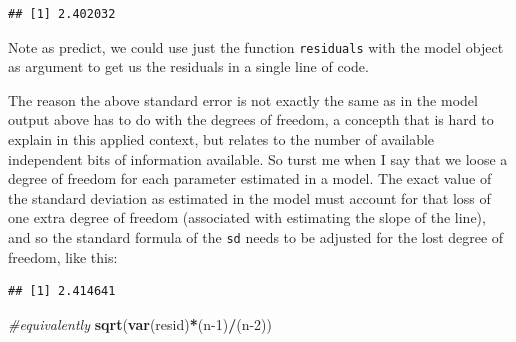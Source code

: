 \documentclass[
]{book}
\newenvironment{Shaded}{\begin{snugshade}}{\end{snugshade}}
\newcommand{\CommentTok}[1]{\textcolor[rgb]{0.56,0.35,0.01}{\textit{#1}}}
\newcommand{\DecValTok}[1]{\textcolor[rgb]{0.00,0.00,0.81}{#1}}
\newcommand{\FunctionTok}[1]{\textcolor[rgb]{0.13,0.29,0.53}{\textbf{#1}}}
\newcommand{\NormalTok}[1]{#1}
\newcommand{\OtherTok}[1]{\textcolor[rgb]{0.56,0.35,0.01}{#1}}
\newcommand{\SpecialCharTok}[1]{\textcolor[rgb]{0.81,0.36,0.00}{\textbf{#1}}}
\begin{document}
\begin{verbatim}
## [1] 2.402032
\end{verbatim}

Note as predict, we could use just the function \texttt{residuals} with the model object as argument to get us the residuals in a single line of code.

The reason the above standard error is not exactly the same as in the model output above has to do with the degrees of freedom, a concepth that is hard to explain in this applied context, but relates to the number of available independent bits of information available. So turst me when I say that we loose a degree of freedom for each parameter estimated in a model. The exact value of the standard deviation as estimated in the model must account for that loss of one extra degree of freedom (associated with estimating the slope of the line), and so the standard formula of the \texttt{sd} needs to be adjusted for the lost degree of freedom, like this:

\begin{Shaded}
\end{Shaded}

\begin{verbatim}
## [1] 2.414641
\end{verbatim}

\begin{Shaded}
\begin{Highlighting}[]
\CommentTok{\#equivalently}
\FunctionTok{sqrt}\NormalTok{(}\FunctionTok{var}\NormalTok{(resid)}\SpecialCharTok{*}\NormalTok{(n}\DecValTok{{-}1}\NormalTok{)}\SpecialCharTok{/}\NormalTok{(n}\DecValTok{{-}2}\NormalTok{))}
\end{Highlighting}
\end{Shaded}
\end{document}
